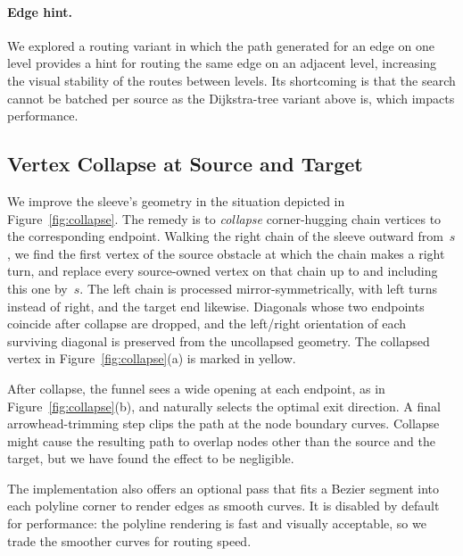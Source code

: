 \paragraph{Edge hint.}
We explored a routing variant in which the path generated for an edge
on one level provides a hint for routing the same edge on an adjacent
level, increasing the visual stability of the routes between
levels. Its shortcoming is that the search cannot be batched per
source as the Dijkstra-tree variant above is, which impacts
performance.

\subsection{Vertex Collapse at Source and Target}
\label{sec:collapse}

We improve the sleeve's geometry in the situation depicted in
Figure~\ref{fig:collapse}. The remedy is to \emph{collapse}
corner-hugging chain vertices to the corresponding endpoint. Walking
the right chain of the sleeve outward from~$s$, we
find the first vertex of the source obstacle at which the chain makes
a right turn, and replace every source-owned vertex on that chain
up to and including this one by~$s$. The left chain is processed
mirror-symmetrically, with left turns instead of right, and the
target end likewise. Diagonals whose two endpoints coincide after
collapse are dropped, and the left/right orientation of each surviving
diagonal is preserved from the uncollapsed geometry. The collapsed
vertex in Figure~\ref{fig:collapse}(a) is marked in yellow.

After collapse, the funnel sees a wide opening at each endpoint, as in
Figure~\ref{fig:collapse}(b), and naturally selects the optimal exit
direction. A final arrowhead-trimming step clips the path at the node
boundary curves. Collapse might cause the resulting path to overlap
nodes other than the source and the target, but we have found the
effect to be negligible.

The implementation also offers an optional pass that fits a Bezier segment into each polyline corner to render edges as smooth curves. It is disabled by default for performance: the polyline rendering is fast and visually acceptable, so we trade the smoother curves for routing speed.

